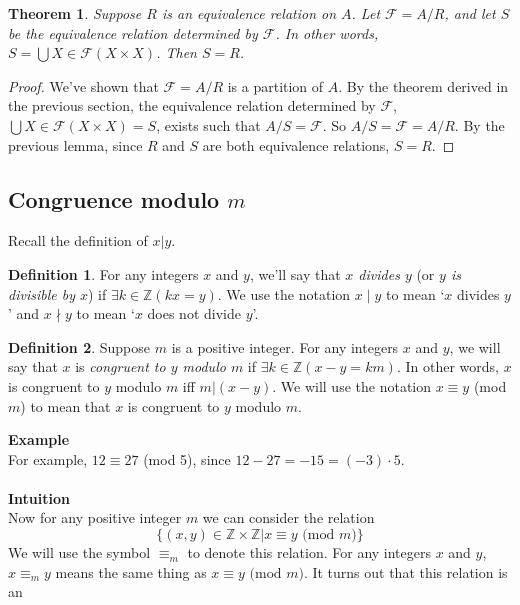 \documentclass{report}
\newtheorem*{theorem}{Theorem}
\theoremstyle{definition}
\newtheorem*{definition}{Definition}
\begin{document}
\begin{theorem}
Suppose $R$ is an equivalence relation on $A$. Let $\mathcal F=A/R$, and let $S$ be the equivalence relation determined by $\mathcal F$. In other words, $S=\bigcup X\in\mathcal F(X\times X)$. 
Then $S=R$.
\end{theorem}
\begin{proof}
We've shown that $\mathcal F=A/R$ is a partition of $A$. By the theorem derived in the previous section, the equivalence relation determined by $\mathcal F$, $\bigcup X\in\mathcal F(X\times X)=S$, 
exists such that $A/S=\mathcal F$. So $A/S=\mathcal F=A/R$. By the previous lemma, since $R$ and $S$ are both equivalence relations, $S=R$.
\end{proof}
\newpage

\subsection{Congruence modulo $m$}
Recall the definition of $x|y$.
\begin{definition}
For any integers $x$ and $y$, we'll say that \textit{$x$ divides $y$} (or \textit{$y$ is divisible by $x$}) if $\exists k\in\mathbb{Z}(kx=y)$. We use the notation $x\mid y$ to mean 
`$x$ divides $y$' and $x\nmid y$ to mean `$x$ does not divide $y$'.
\end{definition}
\begin{definition}
Suppose $m$ is a positive integer. For any integers $x$ and $y$, we will say that $x$ is \textit{congruent to $y$ modulo $m$} if $\exists k\in\mathbb Z(x-y=km)$. In other words,
$x$ is congruent to $y$ modulo $m$ iff $m|(x-y)$. We will use the notation $x\equiv y$ (mod $m$) to mean that $x$ is congruent to $y$ modulo $m$.
\end{definition}
\noindent\textbf{Example}\\
For example, $12\equiv27$ (mod 5), since $12-27=-15=(-3)\cdot5$.\\
\vspace{1mm}\\
\textbf{Intuition}\\
Now for any positive integer $m$ we can consider the relation
\begin{equation*}
\{(x,y)\in\mathbb Z\times\mathbb Z|x\equiv y\text{ (mod $m$)}\}
\end{equation*}
We will use the symbol $\equiv_m$ to denote this relation. For any integers $x$ and $y$, $x\equiv_m y$ means the same thing as $x\equiv y\text{ (mod $m$)}$. It turns out that this relation is an
\end{document}
